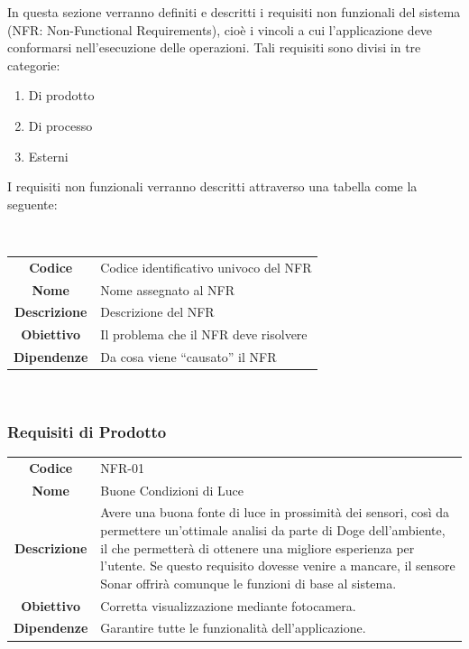 \documentclass{article}
\begin{document}
    In questa sezione verranno definiti e descritti i requisiti non funzionali del sistema (NFR: Non-Functional Requirements), cioè i vincoli a cui l’applicazione deve conformarsi nell'esecuzione delle operazioni.
    Tali requisiti sono divisi in tre categorie:
    \begin{enumerate}
        \item Di prodotto
        \item Di processo
        \item Esterni
    \end{enumerate}
    
    I requisiti non funzionali verranno descritti attraverso una tabella come la seguente:
    
    ~
    
    \begin{adjustbox}{center}
    \begin{tabular}{|c|p{10cm}|}
    \hline
    \textbf{Codice} & Codice identificativo univoco del NFR\\
    \textbf{Nome} & Nome assegnato al NFR\\
    \textbf{Descrizione} & Descrizione del NFR\\
    \textbf{Obiettivo} & Il problema che il NFR deve risolvere\\
    \textbf{Dipendenze} & Da cosa viene ``causato'' il NFR\\
    \hline
    \end{tabular}
    \end{adjustbox}
    
    ~
    
    \subsubsection{Requisiti di Prodotto}
    
    \begin{adjustbox}{center}
    \begin{tabular}{|c|p{10cm}|}
    \hline
    \textbf{Codice} & NFR-01 \\
    \textbf{Nome} & Buone Condizioni di Luce \\
    \textbf{Descrizione} & Avere una buona fonte di luce in prossimità dei sensori, così da permettere un'ottimale analisi da parte di Doge dell'ambiente, il che permetterà di ottenere una migliore esperienza per l'utente. Se questo requisito dovesse venire a mancare, il sensore Sonar offrirà comunque le funzioni di base al sistema. \\
    \textbf{Obiettivo} & Corretta visualizzazione mediante fotocamera. \\
    \textbf{Dipendenze} & Garantire tutte le funzionalità dell'applicazione. \\
    \hline
    \end{tabular}
    \end{adjustbox}
    
\end{document}
